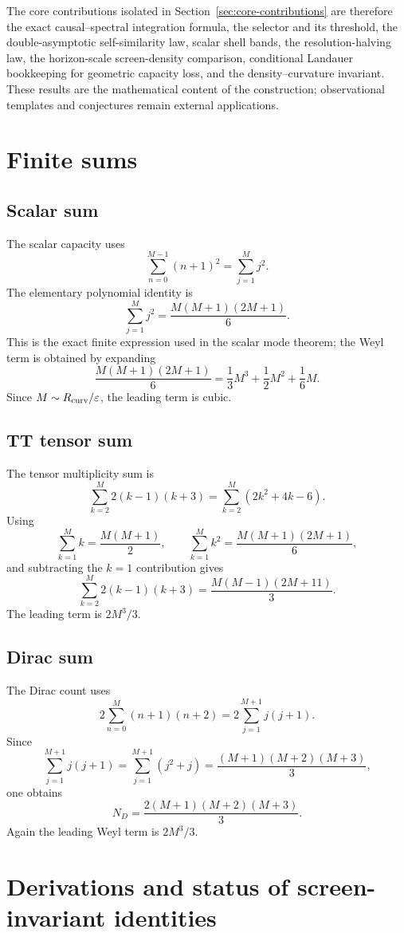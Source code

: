 \documentclass[11pt,a4paper]{article}
\begin{document}
The core contributions isolated in Section~\ref{sec:core-contributions} are therefore the exact causal--spectral integration formula, the selector and its threshold, the double-asymptotic self-similarity law, scalar shell bands, the resolution-halving law, the horizon-scale screen-density comparison, conditional Landauer bookkeeping for geometric capacity loss, and the density--curvature invariant.  These results are the mathematical content of the construction; observational templates and conjectures remain external applications.


\appendix


\section{Finite sums}

\subsection{Scalar sum}
The scalar capacity uses
\[
\sum_{n=0}^{M-1}(n+1)^2=\sum_{j=1}^{M}j^2.
\]
The elementary polynomial identity is
\[
\sum_{j=1}^{M}j^2=\frac{M(M+1)(2M+1)}{6}.
\]
This is the exact finite expression used in the scalar mode theorem; the Weyl term is obtained by expanding
\[
\frac{M(M+1)(2M+1)}{6}
=
\frac13M^3+\frac12M^2+\frac16M.
\]
Since $M\sim R_{\rm curv}/\varepsilon$, the leading term is cubic.

\subsection{TT tensor sum}
The tensor multiplicity sum is
\[
\sum_{k=2}^{M}2(k-1)(k+3)
=
\sum_{k=2}^{M}(2k^2+4k-6).
\]
Using
\[
\sum_{k=1}^{M}k=\frac{M(M+1)}2,
\qquad
\sum_{k=1}^{M}k^2=\frac{M(M+1)(2M+1)}6,
\]
and subtracting the $k=1$ contribution gives
\[
\sum_{k=2}^{M}2(k-1)(k+3)
=
\frac{M(M-1)(2M+11)}3.
\]
The leading term is $2M^3/3$.

\subsection{Dirac sum}
The Dirac count uses
\[
2\sum_{n=0}^{M}(n+1)(n+2)
=
2\sum_{j=1}^{M+1}j(j+1).
\]
Since
\[
\sum_{j=1}^{M+1}j(j+1)
=
\sum_{j=1}^{M+1}(j^2+j)
=
\frac{(M+1)(M+2)(M+3)}3,
\]
one obtains
\[
N_D=
\frac{2(M+1)(M+2)(M+3)}3.
\]
Again the leading Weyl term is $2M^3/3$.


\section{Derivations and status of screen-invariant identities}
\label{app:screen-invariant-derivations}
\end{document}
